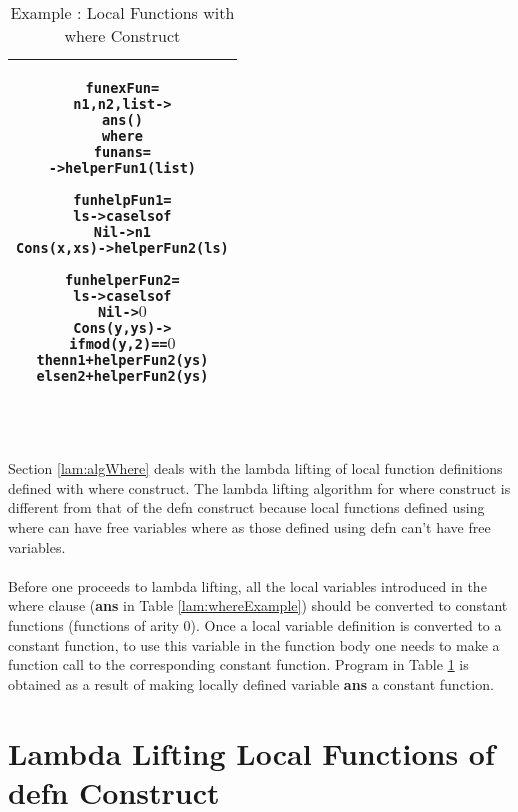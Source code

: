 \documentclass[11pt]{article}
\begin{document}
\begin{table}[!h]
\begin{center}
\begin{tabular}{|c|} \hline
\begin{minipage}{3.8in}
\begin{alltt}


  fun exFun = 
      n1,n2,list -> 
          ans() 
        where
          fun ans =
                 -> helperFun1 (list)

          fun helpFun1 = 
              ls -> case ls of 
                      Nil -> n1
                      Cons(x,xs) -> helperFun2(ls)

          fun helperFun2 =
              ls -> case ls of
                      Nil -> \(0\)
                      Cons(y,ys) ->
                        if mod(y,2) == \(0\) 
                          then n1 + helperFun2(ys)
                          else n2 + helperFun2(ys) 

\end{alltt} 
\end {minipage} 
\tabularnewline
\hline
\end{tabular}
\caption{Example : Local Functions with {\sf where} Construct}
\label{lam:whereExVarsubs}
\end{center}
\end{table}
~~\\~~\\
Section \ref {lam:algWhere} deals with the lambda lifting of local function definitions defined with {\sf where} construct. The lambda lifting algorithm for {\sf where} construct is different from that of the {\sf defn} construct because local functions defined using {\sf where} can have free variables where as those defined using {\sf defn} can't have free variables.
~~\\~~\\
Before one proceeds to lambda lifting, all the local variables introduced in the {\sf where} clause ({\bf ans} in Table \ref {lam:whereExample}) should be converted to constant functions (functions of arity 0). Once a local variable definition is converted to a constant function, to use this variable in the function body one needs to make a function call to the corresponding constant function. Program in Table \ref {lam:whereExVarsubs} is obtained as a result of 
making locally defined variable {\bf ans} a constant function.


\section {Lambda Lifting Local Functions of defn Construct}\label{lam:algDefn}
\end{document}
